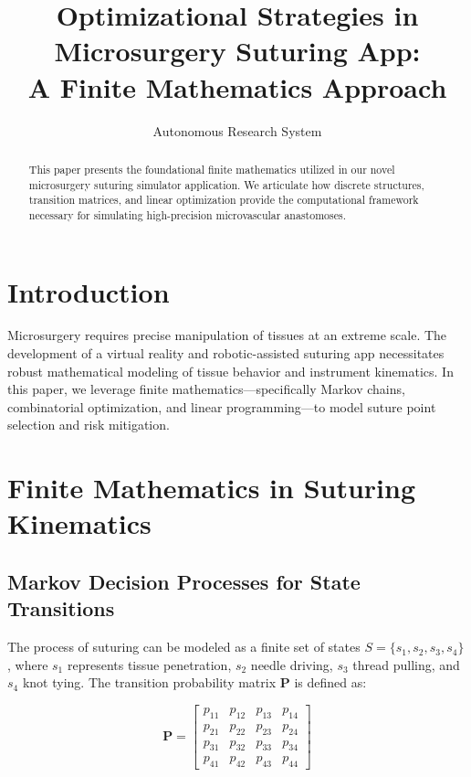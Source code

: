 \documentclass[11pt]{article}
\title{Optimizational Strategies in Microsurgery Suturing App:\\ A Finite Mathematics Approach}
\author{Autonomous Research System}
\affil{Department of Computational Surgery}
\date{}
\begin{document}
\maketitle

\begin{abstract}
This paper presents the foundational finite mathematics utilized in our novel microsurgery suturing simulator application. We articulate how discrete structures, transition matrices, and linear optimization provide the computational framework necessary for simulating high-precision microvascular anastomoses.
\end{abstract}

\section{Introduction}
Microsurgery requires precise manipulation of tissues at an extreme scale. The development of a virtual reality and robotic-assisted suturing app necessitates robust mathematical modeling of tissue behavior and instrument kinematics. In this paper, we leverage finite mathematics---specifically Markov chains, combinatorial optimization, and linear programming---to model suture point selection and risk mitigation.

\section{Finite Mathematics in Suturing Kinematics}

\subsection{Markov Decision Processes for State Transitions}
The process of suturing can be modeled as a finite set of states $S = \{s_1, s_2, s_3, s_4\}$, where $s_1$ represents tissue penetration, $s_2$ needle driving, $s_3$ thread pulling, and $s_4$ knot tying. The transition probability matrix $\mathbf{P}$ is defined as:

\begin{equation}
\mathbf{P} = \begin{bmatrix}
p_{11} & p_{12} & p_{13} & p_{14} \\
p_{21} & p_{22} & p_{23} & p_{24} \\
p_{31} & p_{32} & p_{33} & p_{34} \\
p_{41} & p_{42} & p_{43} & p_{44}
\end{bmatrix}
\end{equation}
\end{document}
